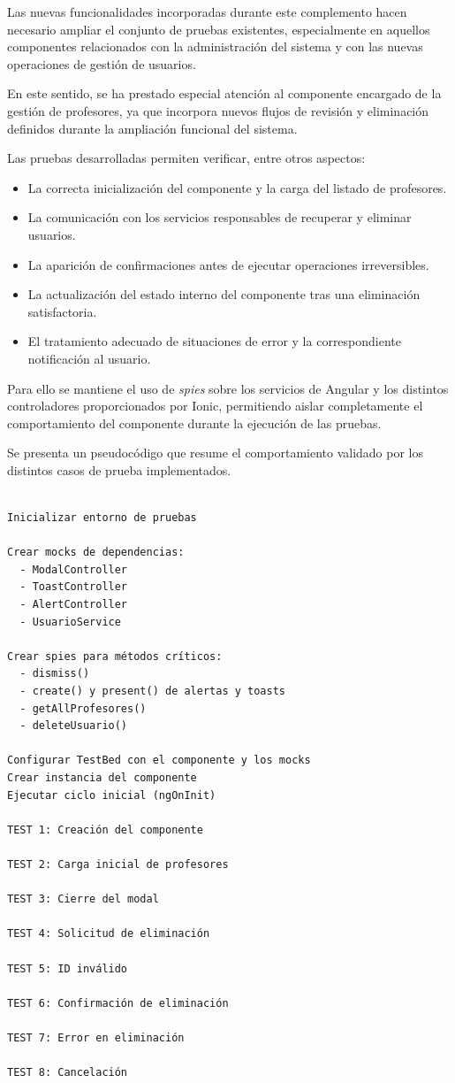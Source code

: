 Las nuevas funcionalidades incorporadas durante este complemento hacen necesario ampliar el conjunto de pruebas existentes, especialmente en aquellos componentes relacionados con la administración del sistema y con las nuevas operaciones de gestión de usuarios.

En este sentido, se ha prestado especial atención al componente encargado de la gestión de profesores, ya que incorpora nuevos flujos de revisión y eliminación definidos durante la ampliación funcional del sistema.

Las pruebas desarrolladas permiten verificar, entre otros aspectos:

\begin{itemize}
    \item La correcta inicialización del componente y la carga del listado de profesores.
    \item La comunicación con los servicios responsables de recuperar y eliminar usuarios.
    \item La aparición de confirmaciones antes de ejecutar operaciones irreversibles.
    \item La actualización del estado interno del componente tras una eliminación satisfactoria.
    \item El tratamiento adecuado de situaciones de error y la correspondiente notificación al usuario.
\end{itemize}

Para ello se mantiene el uso de \textit{spies} sobre los servicios de Angular y los distintos controladores proporcionados por Ionic, permitiendo aislar completamente el comportamiento del componente durante la ejecución de las pruebas.

Se presenta un pseudocódigo que resume el comportamiento validado por los distintos casos de prueba implementados.

\begin{Verbatim}[frame=single, fontsize=\small, xleftmargin=10pt, xrightmargin=10pt]

Inicializar entorno de pruebas

Crear mocks de dependencias:
  - ModalController
  - ToastController
  - AlertController
  - UsuarioService

Crear spies para métodos críticos:
  - dismiss()
  - create() y present() de alertas y toasts
  - getAllProfesores()
  - deleteUsuario()

Configurar TestBed con el componente y los mocks
Crear instancia del componente
Ejecutar ciclo inicial (ngOnInit)

TEST 1: Creación del componente

TEST 2: Carga inicial de profesores

TEST 3: Cierre del modal

TEST 4: Solicitud de eliminación

TEST 5: ID inválido

TEST 6: Confirmación de eliminación

TEST 7: Error en eliminación

TEST 8: Cancelación

\end{Verbatim}

